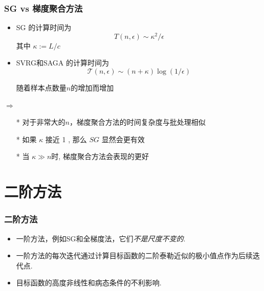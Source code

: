 \documentclass[handout]{beamer}
\begin{document}
\begin{frame}[fragile]
  \frametitle{SG vs 梯度聚合方法}
\begin{itemize}
  \item SG 的计算时间为 $$T(n, \epsilon) \sim \kappa^{2} / \epsilon$$ 
  其中 $\kappa:=L / c$
  \item SVRG和SAGA 的计算时间为
  $$\mathcal{T}(n, \epsilon) \sim(n+\kappa) \log (1 / \epsilon)$$

  随着样本点数量$n$的增加而增加
\end{itemize}

$\Rightarrow$
\begin{itemize}
  \item[*] 对于非常大的$n$，梯度聚合方法的时间复杂度与批处理相似
  \item[*] 如果 $\kappa$ 接近 1 , 那么 $SG $ 显然会更有效
  \item[*] 当 $\kappa \gg n$时, 梯度聚合方法会表现的更好
\end{itemize}
\end{frame}



\section{二阶方法}
\begin{frame}[fragile]
	\frametitle{二阶方法}
	\begin{itemize}
		\item 一阶方法，例如SG和全梯度法，它们\textit{不是尺度不变的}.
		\item 一阶方法的每次迭代通过计算目标函数的二阶泰勒近似的极小值点作为后续迭代点.
		\item 目标函数的高度非线性和病态条件的不利影响.
	\end{itemize}
	
\end{frame}
\end{document}
